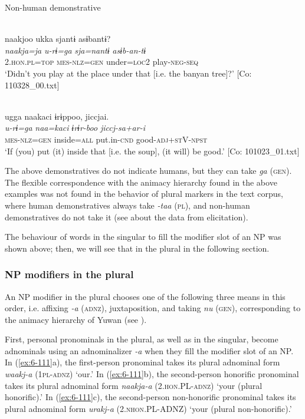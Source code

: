 \begin{table}
\ea\label{ex:6-110}
  Non-human demonstrative

 \ea{}\\
{\TM}
\glll  naakjoo  ukka  sjantɨ  asɨbantɨ?\\
\textit{naakja=ja}  \textit{u-rɨ=ga}  \textit{sja=nantɨ}  \textit{asɨb-an-tɨ}\\
2.\textsc{hon}.\textsc{pl}=\textsc{top}  \textsc{mes}-\textsc{nlz}=\textsc{gen}  under=\textsc{loc}2  play-\textsc{neg}-\textsc{seq}\\
\glt ‘Didn’t you play at the place under that [i.e. the banyan tree]?’ [Co: 110328\_00.txt]
\z

\ex{}\\
{\TM}
\glll  ugga  naakaci  ɨrɨppoo,  jiccjai.\\
\textit{u-rɨ=ga}  \textit{naa=kaci}  \textit{ɨrɨr-boo}  \textit{jiccj-sa+ar-i}\\
\textsc{mes}-\textsc{nlz}=\textsc{gen}  inside=\textsc{all}  put.in-\textsc{cnd}  good-\textsc{adj}+\textsc{st}V-\textsc{npst}\\
\glt ‘If (you) put (it) inside that [i.e. the soup], (it will) be good.’ [Co: 101023\_01.txt]
\z

The above demonstratives do not indicate humans, but they can take \textit{ga} (\textsc{gen}). The flexible correspondence with the animacy hierarchy found in the above examples was not found in the behavior of plural markers in the text corpus, where human demonstratives always take \textit{-taa} (\textsc{pl}), and non-human demonstratives do not take it (see  about the data from elicitation).

  The behaviour of words in the singular to fill the modifier slot of an NP was shown above; then, we will see that in the plural in the following section.

\subsubsection{NP modifiers in the plural}

An NP modifier in the plural chooses one of the following three means in this order, i.e. affixing \textit{-a} (\textsc{adnz}), juxtaposition, and taking \textit{nu} (\textsc{gen}), corresponding to the animacy hierarchy of Yuwan (see ).

First, personal pronominals in the plural, as well as in the singular, become adnominals using an adnominalizer \textit{-a} when they fill the modifier slot of an NP. In (\ref{ex:6-111}a), the first-person pronominal takes its plural adnominal form \textit{waakj-a} (1\textsc{pl}-\textsc{adnz}) ‘our.’ In (\ref{ex:6-111}b), the second-person honorific pronominal takes its plural adnominal form \textit{naakja-a} (2.\textsc{hon}.PL-\textsc{adnz}) ‘your (plural honorific).’ In (\ref{ex:6-111}c), the second-person non-honorific pronominal takes its plural adnominal form \textit{urakj-a} (2.\textsc{nhon}.PL-ADNZ) ‘your (plural non-honorific).’


\end{table}
